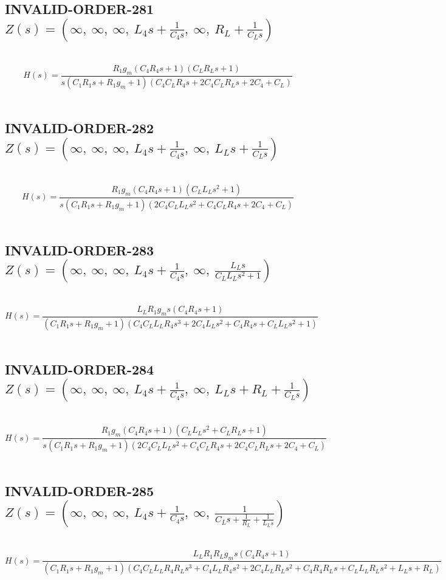 \documentclass{article}
\begin{document}
\subsection{INVALID-ORDER-281 $Z(s) = \left( \infty, \  \infty, \  \infty, \  L_{4} s + \frac{1}{C_{4} s}, \  \infty, \  R_{L} + \frac{1}{C_{L} s}\right)$ } \ 
\textbf{\[H(s) = \frac{R_{1} g_{m} \left(C_{4} R_{4} s + 1\right) \left(C_{L} R_{L} s + 1\right)}{s \left(C_{1} R_{1} s + R_{1} g_{m} + 1\right) \left(C_{4} C_{L} R_{4} s + 2 C_{4} C_{L} R_{L} s + 2 C_{4} + C_{L}\right)}\] } \ 
\subsection{INVALID-ORDER-282 $Z(s) = \left( \infty, \  \infty, \  \infty, \  L_{4} s + \frac{1}{C_{4} s}, \  \infty, \  L_{L} s + \frac{1}{C_{L} s}\right)$ } \ 
\textbf{\[H(s) = \frac{R_{1} g_{m} \left(C_{4} R_{4} s + 1\right) \left(C_{L} L_{L} s^{2} + 1\right)}{s \left(C_{1} R_{1} s + R_{1} g_{m} + 1\right) \left(2 C_{4} C_{L} L_{L} s^{2} + C_{4} C_{L} R_{4} s + 2 C_{4} + C_{L}\right)}\] } \ 
\subsection{INVALID-ORDER-283 $Z(s) = \left( \infty, \  \infty, \  \infty, \  L_{4} s + \frac{1}{C_{4} s}, \  \infty, \  \frac{L_{L} s}{C_{L} L_{L} s^{2} + 1}\right)$ } \ 
\textbf{\[H(s) = \frac{L_{L} R_{1} g_{m} s \left(C_{4} R_{4} s + 1\right)}{\left(C_{1} R_{1} s + R_{1} g_{m} + 1\right) \left(C_{4} C_{L} L_{L} R_{4} s^{3} + 2 C_{4} L_{L} s^{2} + C_{4} R_{4} s + C_{L} L_{L} s^{2} + 1\right)}\] } \ 
\subsection{INVALID-ORDER-284 $Z(s) = \left( \infty, \  \infty, \  \infty, \  L_{4} s + \frac{1}{C_{4} s}, \  \infty, \  L_{L} s + R_{L} + \frac{1}{C_{L} s}\right)$ } \ 
\textbf{\[H(s) = \frac{R_{1} g_{m} \left(C_{4} R_{4} s + 1\right) \left(C_{L} L_{L} s^{2} + C_{L} R_{L} s + 1\right)}{s \left(C_{1} R_{1} s + R_{1} g_{m} + 1\right) \left(2 C_{4} C_{L} L_{L} s^{2} + C_{4} C_{L} R_{4} s + 2 C_{4} C_{L} R_{L} s + 2 C_{4} + C_{L}\right)}\] } \ 
\subsection{INVALID-ORDER-285 $Z(s) = \left( \infty, \  \infty, \  \infty, \  L_{4} s + \frac{1}{C_{4} s}, \  \infty, \  \frac{1}{C_{L} s + \frac{1}{R_{L}} + \frac{1}{L_{L} s}}\right)$ } \ 
\textbf{\[H(s) = \frac{L_{L} R_{1} R_{L} g_{m} s \left(C_{4} R_{4} s + 1\right)}{\left(C_{1} R_{1} s + R_{1} g_{m} + 1\right) \left(C_{4} C_{L} L_{L} R_{4} R_{L} s^{3} + C_{4} L_{L} R_{4} s^{2} + 2 C_{4} L_{L} R_{L} s^{2} + C_{4} R_{4} R_{L} s + C_{L} L_{L} R_{L} s^{2} + L_{L} s + R_{L}\right)}\] } \ 
\end{document}
